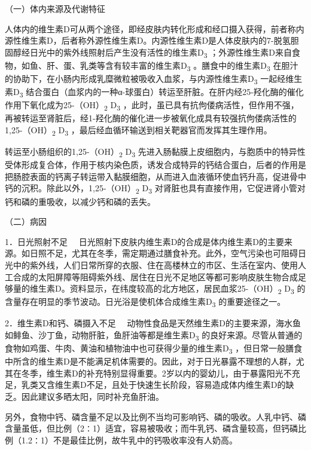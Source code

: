 （一）体内来源及代谢特征

人体内的维生素D可从两个途径，即经皮肤内转化形成和经口摄入获得，前者称内源性维生素D，后者称外源性维生素D。内源性维生素D是人体皮肤内的7-脱氢胆固醇经日光中的紫外线照射后产生没有活性的维生素D\textsubscript{3}
；外源性维生素D来自食物，如鱼、肝、蛋、乳类等含有较丰富的维生素D\textsubscript{3}
。膳食中的维生素D\textsubscript{3}
在胆汁的协助下，在小肠内形成乳糜微粒被吸收入血浆，与内源性维生素D\textsubscript{3}
一起经维生素D\textsubscript{3}
结合蛋白（血浆内的一种α-球蛋白）转运至肝脏。在肝内经25-羟化酶的催化作用下氧化成为25-（OH）\textsubscript{2}
D\textsubscript{3}
，此时，虽已具有抗佝偻病活性，但作用不强，再被转运至肾脏后，经1-羟化酶的催化进一步被氧化成具有较强抗佝偻病活性的1,25-（OH）\textsubscript{2}
D\textsubscript{3} ，最后经血循环输送到相关靶器官而发挥其生理作用。

转运至小肠组织的1,25-（OH）\textsubscript{2} D\textsubscript{3}
先进入肠黏膜上皮细胞内，与胞质中的特异性受体形成复合体，作用于核内染色质，诱发合成特异的钙结合蛋白，后者的作用是把肠腔表面的钙离子转运带入黏膜细胞，从而进入血液循环使血钙升高，促进骨中钙的沉积。除此以外，1,25-（OH）\textsubscript{2}
D\textsubscript{3}
对肾脏也具有直接作用，它促进肾小管对钙和磷的重吸收，以减少钙和磷的丢失。

（二）病因

{1．日光照射不足}
　日光照射下皮肤内维生素D的合成是体内维生素D的主要来源。如日照不足，尤其在冬季，需定期通过膳食补充。此外，空气污染也可阻碍日光中的紫外线，人们日常所穿的衣服、住在高楼林立的市区、生活在室内、使用人工合成的太阳屏障等阻碍紫外线、居住在日光不足地区等都可影响皮肤生物合成足够量的维生素D。资料显示，在纬度较高的北方地区，居民血浆25-（OH）\textsubscript{2}
D\textsubscript{3}
的含量存在明显的季节波动。日光浴是使机体合成维生素D\textsubscript{3}
的重要途径之一。

{2．维生素D和钙、磷摄入不足}
　动物性食品是天然维生素D的主要来源，海水鱼如鲱鱼、沙丁鱼，动物肝脏，鱼肝油等都是维生素D\textsubscript{3}
的良好来源。尽管从普通的食物如鸡蛋、牛肉、黄油和植物油中也可获得少量的维生素D\textsubscript{3}
，但日常一般膳食中所含的维生素D是不能满足机体需要的。因此，对于日光暴露不理想的人群，尤其在冬季，维生素D的补充特别显得重要。2岁以内的婴幼儿，由于暴露阳光不充足，乳类又含维生素D不足，且处于快速生长阶段，容易造成体内维生素D的缺乏。因此建议多晒太阳，同时补充鱼肝油。

另外，食物中钙、磷含量不足以及比例不当均可影响钙、磷的吸收。人乳中钙、磷含量虽低，但比例（2∶1）适宜，容易被吸收；而牛乳钙、磷含量较高，但钙磷比例（1.2∶1）不是最佳比例，故牛乳中的钙吸收率没有人奶高。

